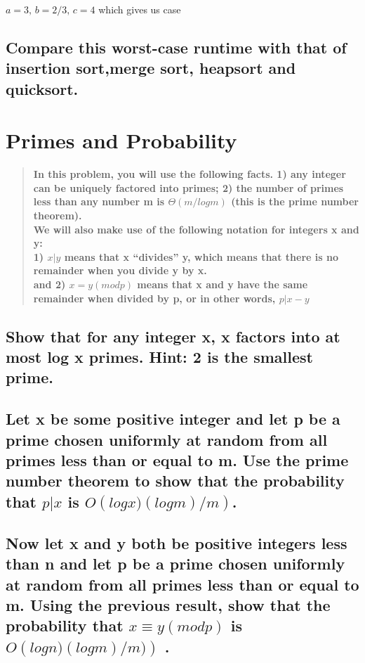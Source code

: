 \documentclass[titlepage]{article}\usepackage[]{graphicx}\usepackage[]{color}
\begin{document}
$a = 3, \, b = 2/3, \, c=4$ which gives us case 


\subsection{ Compare this worst-case runtime with that of insertion sort,merge
sort, heapsort and quicksort.}





\section{Primes and Probability}

\begin{quote}
	\textbf{
In this problem, you will use the following facts. 1) any integer can be
uniquely factored into primes; 2) the number of primes less than any number m
is $\Theta(m/ log m)$ (this is the prime number theorem). \\
We will also make use of the following notation for integers x and y: \\
1) $x|y$ means that x ``divides'' y, which means that there is no remainder
when you divide y by x. \\ 
and 2) $ x = y(modp)$ means that x and y have the same remainder when
divided by p, or in other words, $p|x−y$} 
\end{quote}

\subsection{Show that for any integer x, x factors into at most log x primes. Hint: 2 is
the smallest prime.}

\subsection{ Let x be some positive integer and let p be a prime chosen uniformly at
random from all primes less than or equal to m. Use the prime number theorem to
show that the probability that $p|x$ is $O\left( log x)(log m)/m\right)$. }

\subsection{ Now let x and y both be positive integers less than n and let p be a prime
chosen uniformly at random from all primes less than or equal to m. Using the
previous result, show that the probability that $ x ≡ y (mod p)$  is $ O\left( log
n)(log m)/m)\right)$ . }
\end{document}
